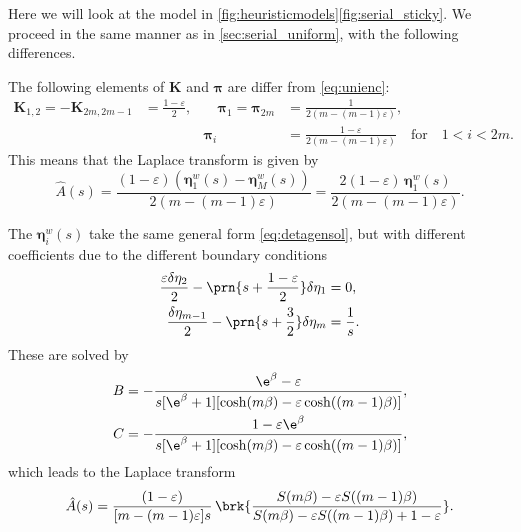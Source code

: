 \documentclass[12pt]{article}
\newcommand{\eq}{\pib}
\newcommand{\pib}{\boldsymbol{\pi}}
\newcommand{\etw}{\boldsymbol{\eta}^w}
\newcommand{\enc}{\mathbf{K}}
\begin{document}
Here we will look at the model in \autoref{fig:heuristicmodels}\ref{fig:serial_sticky}.
We proceed in the same manner as in \autoref{sec:serial_uniform}, with the following differences.

The following elements of $\enc$ and $\eq$ are differ from \eqref{eq:unienc}:
%
\begin{equation}\label{eq:stickyenc}
  \begin{aligned}
  \enc_{1,2} = -\enc_{2m,2m-1} &= \frac{1-\varepsilon}{2},
  &\quad
  \eq_1 = \eq_{2m} &= \frac{1}{2(m-(m-1)\varepsilon)},
  \\ &&
  \eq_i &=  \frac{1-\varepsilon}{2(m-(m-1)\varepsilon)}
  \quad\text{for}\quad 1<i<2m.
  \end{aligned}
\end{equation}
%
This means that the Laplace transform is given by
%
\begin{equation}\label{eq:stickyareaeta}
  \hat{A}(s) = \frac{(1-\varepsilon)(\etw_1(s)-\etw_M(s))}
                    {2(m-(m-1)\varepsilon)}
       = \frac{2(1-\varepsilon)\, \etw_1(s)}{2(m-(m-1)\varepsilon)}.
\end{equation}
%

The $\etw_i(s)$ take the same general form \eqref{eq:detagensol}, but with different coefficients due to the different boundary conditions
%
\begin{equation}\label{eq:detabndsticky}
\begin{aligned}
  \frac{\varepsilon\delta\eta_2}{2} - \prn{s+\frac{1-\varepsilon}{2}}\delta\eta_1 &= 0, \\
  \frac{\delta\eta_{m-1}}{2} - \prn{s+\frac{3}{2}}\delta\eta_{m} &= \frac{1}{s}.
\end{aligned}
\end{equation}
%
These are solved by
%
\begin{equation}\label{eq:stickycoeffs}
\begin{aligned}
  B &= -\frac{\e^{\beta} - \varepsilon}
      {s [\e^{\beta} + 1] [\cosh(m\beta) - \varepsilon \cosh((m-1)\beta)]}, \\
  C &= -\frac{1 - \varepsilon\e^{\beta}}
      {s [\e^{\beta} + 1] [\cosh(m\beta) - \varepsilon \cosh((m-1)\beta)]},
\end{aligned}
\end{equation}
%
which leads to the Laplace transform
%
\begin{equation}\label{eq:stickylaplace}
  \hat{A}(s) = \frac{(1-\varepsilon)}{[m-(m-1)\varepsilon]s} \,
      \brk{\frac{S(m\beta) - \varepsilon S((m-1)\beta)}
      {S(m\beta) - \varepsilon S((m-1)\beta) + 1 - \varepsilon}}.
\end{equation}
%
\end{document}
